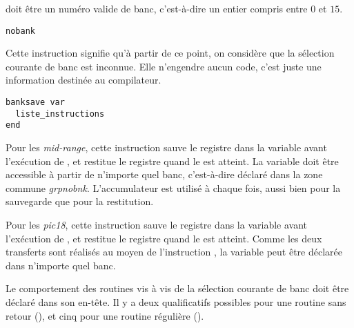  doit être un numéro valide de banc, c'est-à-dire un entier compris entre $0$ et $15$.











\begin{lstlisting}[language=piccolo]
nobank
\end{lstlisting}

Cette instruction signifie qu'à partir de ce point, on considère que la sélection courante de banc est inconnue. Elle n'engendre aucun code, c'est juste une information destinée au compilateur.


\begin{lstlisting}[language=piccolo]
banksave var
  liste_instructions
end
\end{lstlisting}

Pour les \emph{mid-range}, cette instruction sauve le registre  dans la variable  avant l'exécution de , et restitue le registre  quand le  est atteint. La variable  doit être accessible à partir de n'importe quel banc, c'est-à-dire déclaré dans la zone commune \emph{grpnobnk}. L'accumulateur  est utilisé à chaque fois, aussi bien pour la sauvegarde que pour la restitution.

Pour les \emph{pic18}, cette instruction sauve le registre  dans la variable  avant l'exécution de , et restitue le registre  quand le  est atteint. Comme les deux transferts sont réalisés au moyen de l'instruction , la variable  peut être déclarée dans n'importe quel banc.




Le comportement des routines vis à vis de la sélection courante de banc doit être déclaré dans son en-tête. Il y a deux qualificatifs possibles pour une routine sans retour (), et cinq pour une routine régulière ().



